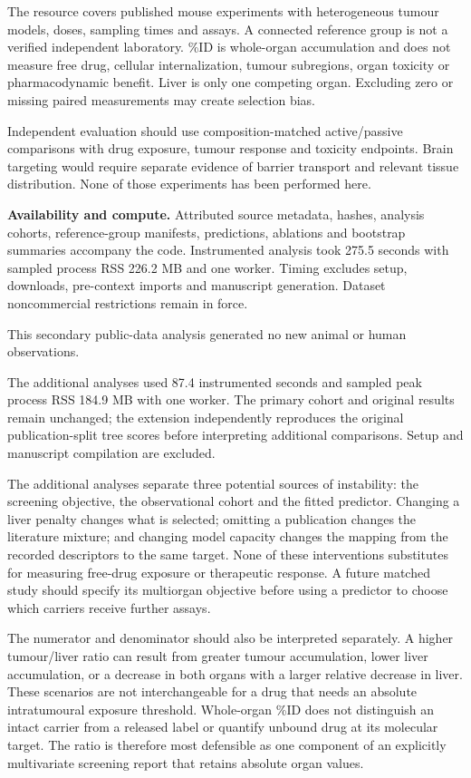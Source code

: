 \documentclass[11pt]{article}
\begin{document}
The resource covers published mouse experiments with heterogeneous tumour models, doses, sampling times and assays. A connected reference group is not a verified independent laboratory. \%ID is whole-organ accumulation and does not measure free drug, cellular internalization, tumour subregions, organ toxicity or pharmacodynamic benefit. Liver is only one competing organ. Excluding zero or missing paired measurements may create selection bias.

Independent evaluation should use composition-matched active/passive comparisons with drug exposure, tumour response and toxicity endpoints. Brain targeting would require separate evidence of barrier transport and relevant tissue distribution. None of those experiments has been performed here.

\textbf{Availability and compute.} Attributed source metadata, hashes, analysis cohorts, reference-group manifests, predictions, ablations and bootstrap summaries accompany the code. Instrumented analysis took 275.5 seconds with sampled process RSS 226.2 MB and one worker. Timing excludes setup, downloads, pre-context imports and manuscript generation. Dataset noncommercial restrictions remain in force.

This secondary public-data analysis generated no new animal or human observations.

The additional analyses used 87.4 instrumented seconds and sampled peak process RSS 184.9 MB with one worker. The primary cohort and original results remain unchanged; the extension independently reproduces the original publication-split tree scores before interpreting additional comparisons. Setup and manuscript compilation are excluded.

The additional analyses separate three potential sources of instability: the screening objective, the observational cohort and the fitted predictor. Changing a liver penalty changes what is selected; omitting a publication changes the literature mixture; and changing model capacity changes the mapping from the recorded descriptors to the same target. None of these interventions substitutes for measuring free-drug exposure or therapeutic response. A future matched study should specify its multiorgan objective before using a predictor to choose which carriers receive further assays.

The numerator and denominator should also be interpreted separately. A higher tumour/liver ratio can result from greater tumour accumulation, lower liver accumulation, or a decrease in both organs with a larger relative decrease in liver. These scenarios are not interchangeable for a drug that needs an absolute intratumoural exposure threshold. Whole-organ \%ID does not distinguish an intact carrier from a released label or quantify unbound drug at its molecular target. The ratio is therefore most defensible as one component of an explicitly multivariate screening report that retains absolute organ values.
\end{document}

